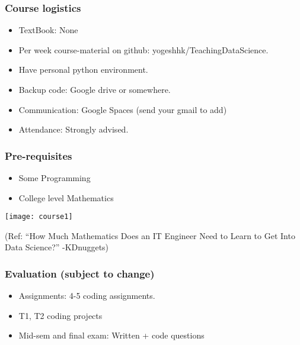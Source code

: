 
\begin{frame}[fragile]\frametitle{Course logistics}
\begin{itemize}
\item TextBook: None
\item Per week course-material on github: yogeshhk/TeachingDataScience.
\item Have personal python environment.
\item Backup code: Google drive or somewhere.
\item Communication: Google Spaces (send your gmail to add)
\item Attendance: Strongly advised.
\end{itemize}
\end{frame}


\begin{frame}[fragile]\frametitle{Pre-requisites}
\begin{itemize}
\item Some Programming
\item College level Mathematics
\end{itemize}
\begin{center}
\texttt{[image: course1]}
\end{center}
{\tiny (Ref: ``How Much Mathematics Does an IT Engineer Need to Learn to Get Into Data Science?'' -KDnuggets)}
\end{frame}

\begin{frame}[fragile]\frametitle{Evaluation (subject to change)}
\begin{itemize}
\item Assignments: 4-5 coding assignments. 
\item T1, T2 coding projects
\item Mid-sem and final exam: Written + code questions
\end{itemize}
\end{frame}

